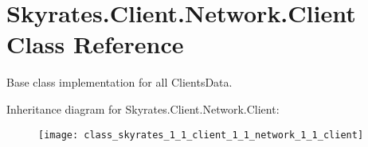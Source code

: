 \hypertarget{class_skyrates_1_1_client_1_1_network_1_1_client}{\section{Skyrates.\-Client.\-Network.\-Client Class Reference}
\label{class_skyrates_1_1_client_1_1_network_1_1_client}
}


Base class implementation for all Clients\-Data.  


Inheritance diagram for Skyrates.\-Client.\-Network.\-Client\-:\begin{figure}[H]
\begin{center}
\leavevmode
\texttt{[image: class\_skyrates\_1\_1\_client\_1\_1\_network\_1\_1\_client]}
\end{center}
\end{figure}
